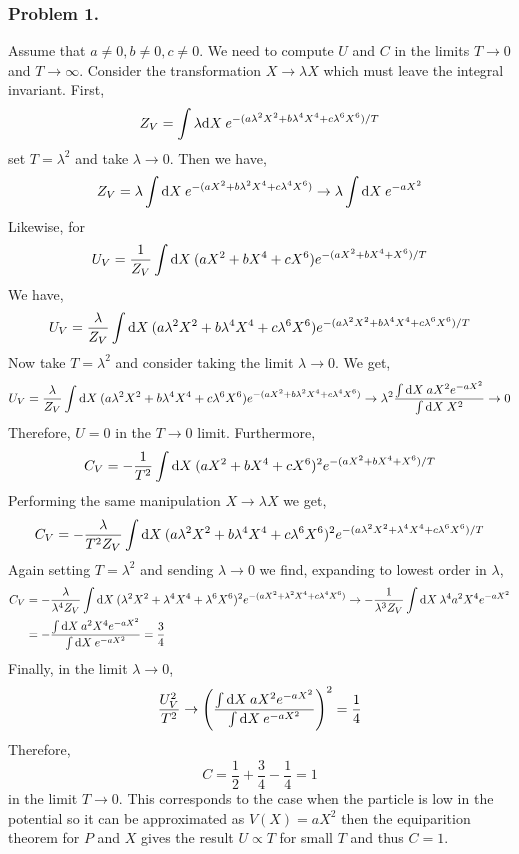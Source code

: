 \documentclass[12pt]{article}
\begin{document}
\subsubsection{Problem 1.}

Assume that $a \neq 0, b \neq 0, c \neq 0$. We need to compute $U$ and $C$
in the limits $T \to 0$ and $T \to \infty$. Consider the transformation $X \to \lambda X$ which must leave the integral invariant. First,
\[ Z_V = \int \lambda \mathrm{d}X \: e^{-(a \lambda^2 X^2 + b \lambda^4 X^4 + c \lambda^6 X^6) / T} \]
set $T = \lambda^2$ and take $\lambda \to 0$. 
Then we have,
\[ Z_V = \lambda \int \mathrm{d}X \: e^{-(a X^2 + b \lambda^2 X^4 + c \lambda^4 X^6)} \to \lambda \int \mathrm{d}X \: e^{-a X^2} \]
Likewise, for
\[ U_V = \frac{1}{Z_V} \int \mathrm{d}X \: (a X^2 + b X^4 + c X^6) e^{-(a X^2 + b X^4 + X^6)/T}  \]
We have,
\[ U_V = \frac{\lambda}{Z_V} \int \mathrm{d}X \: (a \lambda^2 X^2 + b \lambda^4 X^4 + c \lambda^6 X^6) e^{-(a \lambda^2 X^2 + b \lambda^4 X^4 + c \lambda^6 X^6)/T}  \]
Now take $T = \lambda^2$ and consider taking the limit $\lambda \to 0$. We get,
\[ U_V =  \frac{\lambda}{Z_V} \int \mathrm{d}X \: (a \lambda^2 X^2 + b \lambda^4 X^4 + c \lambda^6 X^6) e^{-(a X^2 + b \lambda^2 X^4 + c \lambda^4 X^6)} \to \lambda^2 \frac{\int \mathrm{d}X \: a X^2 e^{-a X^2}}{\int \mathrm{d}X \: X^2}  \to 0 \]
Therefore, $U = 0$ in the $T \to 0$ limit. Furthermore,
\[ C_V =  - \frac{1}{T^2} \int \mathrm{d}X \: (a X^2 + b X^4 + c X^6)^2 e^{-(a X^2 + b X^4 + X^6)/T} \]
Performing the same manipulation $X \to \lambda X$  we get,
\[ C_V = - \frac{\lambda}{T^2 Z_V} \int \mathrm{d}X \: (a \lambda^2 X^2 + b \lambda^4 X^4 + c \lambda^6 X^6)^2 e^{-(a \lambda^2 X^2 + \lambda^4 X^4 + c \lambda^6 X^6)/T}  \]
Again setting $T = \lambda^2$ and sending $\lambda \to 0$ we find, expanding to lowest order in $\lambda$,
\begin{align*}
C_V & = - \frac{\lambda}{\lambda^4 Z_V} \int \mathrm{d}X \: (\lambda^2 X^2 + \lambda^4 X^4 + \lambda^6 X^6)^2 e^{-(a X^2 + \lambda^2 X^4 + c \lambda^4 X^6)}   \to - \frac{1}{\lambda^3 Z_V} \int \mathrm{d}X \: \lambda^4 a^2 X^4 e^{-a X^2}
\\
& = - \frac{\int \mathrm{d}X \: a^2 X^4 e^{-a X^2}}{\int \mathrm{d}X \: e^{-a X^2}} = \frac{3}{4}
\end{align*}
Finally, in the limit $\lambda \to 0$,
\[ \frac{U_V^2}{T^2} \to \left( \frac{\int \mathrm{d}X \: a X^2 e^{-a X^2}}{\int \mathrm{d}X \: e^{-a X^2}} \right)^2 = \frac{1}{4} \]
Therefore,
\[ C = \frac{1}{2} + \frac{3}{4} - \frac{1}{4} = 1 \]
in the limit $T \to 0$. This corresponds to the case when the particle is low in the potential so it can be approximated as $V(X) = a X^2$ then the equiparition theorem for $P$ and $X$ gives the result $U \propto T$ for small $T$ and thus $C = 1$. 
\end{document}
